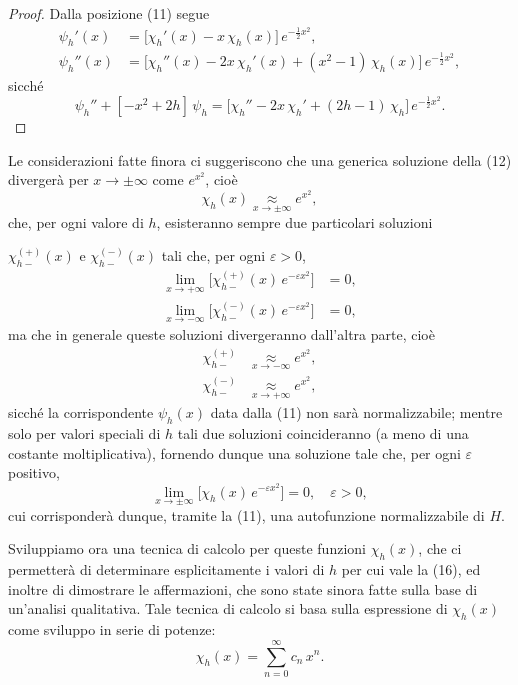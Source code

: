 \documentclass[11pt, a4paper]{book}
\numberwithin{equation}{section}
\begin{document}
\begin{proof}
Dalla posizione (11) segue
\begin{align*}
\psi_h'(x) &= \bigl[\chi_h'(x) - x\,\chi_h(x)\bigr]\,e^{-\frac{1}{2}x^2}, \\
\psi_h''(x) &= \bigl[\chi_h''(x) - 2x\,\chi_h'(x) + (x^2-1)\,\chi_h(x)\bigr]\,
  e^{-\frac{1}{2}x^2},
\end{align*}
sicché
\[
\psi_h'' + [-x^2+2h]\,\psi_h
= \bigl[\chi_h'' - 2x\,\chi_h' + (2h-1)\,\chi_h\bigr]\,e^{-\frac{1}{2}x^2}.
\]
\end{proof}

Le considerazioni fatte finora ci suggeriscono che una generica soluzione
della (12) divergerà per $x \to \pm\infty$ come $e^{x^2}$, cioè
\begin{equation}
\chi_h(x) \underset{x\to\pm\infty}{\approx} e^{x^2},
\end{equation}
che, per ogni valore di $h$, esisteranno sempre due particolari soluzioni


$\chi_{h-}^{(+)}(x)$ e $\chi_{h-}^{(-)}(x)$ tali che, per ogni
$\varepsilon > 0$,
\begin{align}
\lim_{x\to+\infty}\bigl[\chi_{h-}^{(+)}(x)\,e^{-\varepsilon x^2}\bigr] &= 0, \tag{14a} \\
\lim_{x\to-\infty}\bigl[\chi_{h-}^{(-)}(x)\,e^{-\varepsilon x^2}\bigr] &= 0, \tag{14b}
\end{align}
ma che in generale queste soluzioni divergeranno dall'altra parte, cioè
\begin{align}
\chi_{h-}^{(+)} &\underset{x\to-\infty}{\approx} e^{x^2}, \tag{15a} \\
\chi_{h-}^{(-)} &\underset{x\to+\infty}{\approx} e^{x^2}, \tag{15b}
\end{align}
sicché la corrispondente $\psi_h(x)$ data dalla (11) non sarà
normalizzabile; mentre solo per valori speciali di $h$ tali due soluzioni
coincideranno (a meno di una costante moltiplicativa), fornendo dunque una
soluzione tale che, per ogni $\varepsilon$ positivo,
\begin{equation}
\lim_{x\to\pm\infty}\bigl[\chi_h(x)\,e^{-\varepsilon x^2}\bigr] = 0,
\quad \varepsilon > 0,
\end{equation}
cui corrisponderà dunque, tramite la (11), una autofunzione normalizzabile
di $H$.

Sviluppiamo ora una tecnica di calcolo per queste funzioni $\chi_h(x)$,
che ci permetterà di determinare esplicitamente i valori di $h$ per cui
vale la (16), ed inoltre di dimostrare le affermazioni, che sono state
sinora fatte sulla base di un'analisi qualitativa. Tale tecnica di
calcolo si basa sulla espressione di $\chi_h(x)$ come sviluppo in serie
di potenze:
\begin{equation}
\chi_h(x) = \sum_{n=0}^{\infty} c_n\,x^n.
\end{equation}
\end{document}
